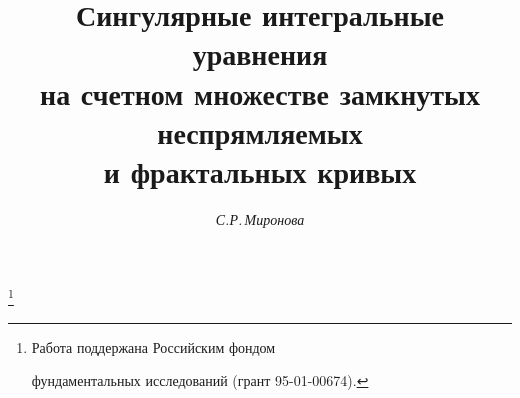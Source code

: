 




%









\newcommand{\E}{\mathrm{E}}


\newcommand{\X}{\mathrm{X}}


\newcommand{\grad}{\operatorname{grad}}


\newcommand{\dist}{\operatorname{dist}}


\newcommand{\const}{\operatorname{const}}


\newcommand{\tts}[1]{}










\setcounter{page}{43}












\author{\it С.Р.\,Миронова}




\title{Сингулярные интегральные уравнения\\


на счетном множестве замкнутых неспрямляемых\\


и фрактальных кривых}





\thanks{Работа поддержана Российским фондом


фундаментальных исследований (грант 95-01-00674).}


